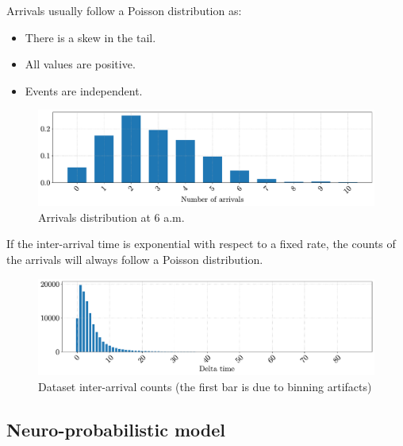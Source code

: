 \begin{remark}
    Arrivals usually follow a Poisson distribution as:
    \begin{itemize}
        \item There is a skew in the tail.
        \item All values are positive.
        \item Events are independent.
    \end{itemize}

    \begin{figure}[H]
        \centering
        \includegraphics[width=0.8\linewidth]{./img/_skinwrapper_poisson.pdf}
        \caption{Arrivals distribution at 6 a.m.}
    \end{figure}

    \begin{theorem}
        If the inter-arrival time is exponential with respect to a fixed rate, the counts of the arrivals will always follow a Poisson distribution.
    \end{theorem}

    \begin{figure}[H]
        \centering
        \includegraphics[width=0.8\linewidth]{./img/_skinwrapper_interarrival.pdf}
        \caption{Dataset inter-arrival counts (the first bar is due to binning artifacts)}
    \end{figure}
\end{remark}

\subsection{Neuro-probabilistic model}

